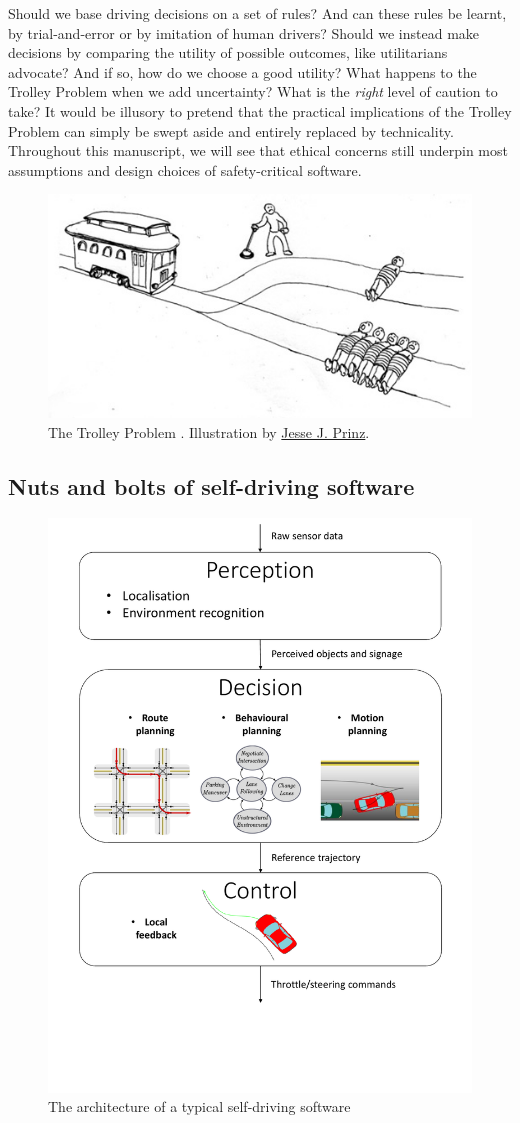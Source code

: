 Should we base driving decisions on a set of rules? And can these rules be learnt, by trial-and-error or by imitation of human drivers? Should we instead make decisions by comparing the utility of possible outcomes, like utilitarians advocate? And if so, how do we choose a good utility? What happens to the Trolley Problem when we add uncertainty? What is the \emph{right} level of caution to take? It would be illusory to pretend that the practical implications of the Trolley Problem can simply be swept aside and entirely replaced by technicality. Throughout this manuscript, we will see that ethical concerns still underpin most assumptions and design choices of safety-critical software.


\begin{figure}[tp]
	\centering
	\includegraphics[width=0.7\linewidth]{img/trolley}
	\caption{The Trolley Problem \citep{Foot1967}. Illustration by \href{http://subcortex.com/}{Jesse J. Prinz}.}
	\label{fig:trolley}
\end{figure}

\subsection{Nuts and bolts of self-driving software}

\begin{figure}[th]
	\centering
	\includegraphics[trim={0 5cm 0 0}, clip, width=0.7\linewidth]{img/pipeline}
	\caption{The architecture of a typical self-driving software}
	\label{fig:robotics-pipeline}
\end{figure}

